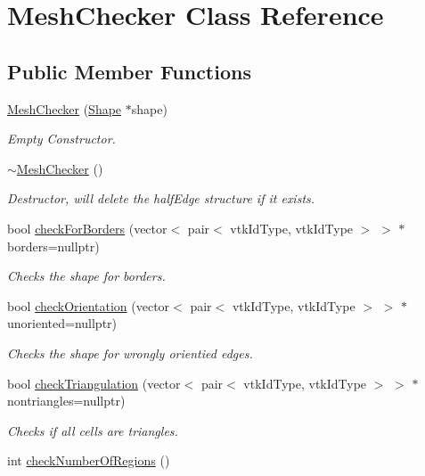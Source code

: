 \hypertarget{class_mesh_checker}{}\section{Mesh\+Checker Class Reference}
\label{class_mesh_checker}
\subsection*{Public Member Functions}
\begin{DoxyCompactItemize}
\item 
\hypertarget{class_mesh_checker_a9952333587b195bfa117aa4003218043}{}\hyperlink{class_mesh_checker_a9952333587b195bfa117aa4003218043}{Mesh\+Checker} (\hyperlink{class_shape}{Shape} $\ast$shape)\label{class_mesh_checker_a9952333587b195bfa117aa4003218043}

\begin{DoxyCompactList}\small\item\em Empty Constructor. \end{DoxyCompactList}\item 
\hypertarget{class_mesh_checker_a9fbab462b8dddb7de3d8f60de6486d93}{}\hyperlink{class_mesh_checker_a9fbab462b8dddb7de3d8f60de6486d93}{$\sim$\+Mesh\+Checker} ()\label{class_mesh_checker_a9fbab462b8dddb7de3d8f60de6486d93}

\begin{DoxyCompactList}\small\item\em Destructor, will delete the half\+Edge structure if it exists. \end{DoxyCompactList}\item 
bool \hyperlink{class_mesh_checker_ae24c4e3f5feff68c83726fb23d97585f}{check\+For\+Borders} (vector$<$ pair$<$ vtk\+Id\+Type, vtk\+Id\+Type $>$ $>$ $\ast$borders=nullptr)
\begin{DoxyCompactList}\small\item\em Checks the shape for borders. \end{DoxyCompactList}\item 
bool \hyperlink{class_mesh_checker_af43afc7f2b3882664f0ee2391c147efb}{check\+Orientation} (vector$<$ pair$<$ vtk\+Id\+Type, vtk\+Id\+Type $>$ $>$ $\ast$unoriented=nullptr)
\begin{DoxyCompactList}\small\item\em Checks the shape for wrongly orientied edges. \end{DoxyCompactList}\item 
bool \hyperlink{class_mesh_checker_a98cde65ece5f709e4ef3657cb8129fa4}{check\+Triangulation} (vector$<$ pair$<$ vtk\+Id\+Type, vtk\+Id\+Type $>$ $>$ $\ast$nontriangles=nullptr)
\begin{DoxyCompactList}\small\item\em Checks if all cells are triangles. \end{DoxyCompactList}\item 
\hypertarget{class_mesh_checker_a95c42fdfb234e0be1d70ba255dbb5703}{}int \hyperlink{class_mesh_checker_a95c42fdfb234e0be1d70ba255dbb5703}{check\+Number\+Of\+Regions} ()\label{class_mesh_checker_a95c42fdfb234e0be1d70ba255dbb5703}


\end{DoxyCompactItemize}
